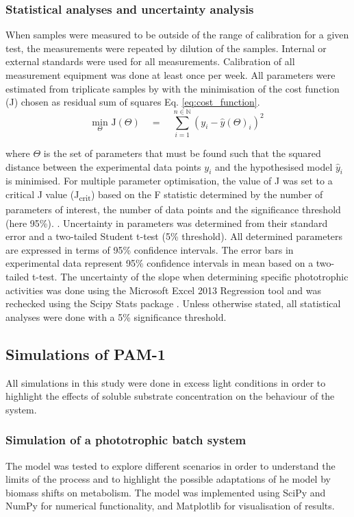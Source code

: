\subsubsection{Statistical analyses and uncertainty analysis}
When samples were measured to be outside of the range of calibration for a given test, the measurements were repeated by dilution of the samples. Internal or external standards were used for all measurements. Calibration of all measurement equipment was done at least once per week. All parameters were estimated from triplicate samples by with the minimisation of the cost function (J) chosen as residual sum of squares Eq. \eqref{eq:cost_function}.
\begin{equation}
    \label{eq:cost_function}
    \underset{\Theta}{\mathrm{min}}\, \, \mathrm{J}(\Theta)\quad  = \quad \sum_{i = 1}^{n\in\mathbb{N}} \left(y_i - \hat{y}(\Theta)_i    \right)^2
\end{equation}

where $\Theta$ is the set of parameters that must be found such that the squared distance between the experimental data points $y_i$ and the hypothesised model $\hat{y}_i$ is minimised. For multiple parameter optimisation, the value of J was set to a critical J value (J\textsubscript{crit}) based on the F statistic determined by the number of parameters of interest, the number of data points and the significance threshold (here 95\%). \cite{Batstone2003}. Uncertainty in parameters was determined from their standard error and a two-tailed Student t-test (5\% threshold). All determined parameters are expressed in terms of 95\% confidence intervals. The error bars in experimental data represent 95\% confidence intervals in mean based on a two-tailed t-test. The uncertainty of the slope when determining specific phototrophic activities was done using the Microsoft Excel 2013 Regression tool and was rechecked using the Scipy Stats package \cite{Scipy2001}. Unless otherwise stated, all statistical analyses were done with a 5\% significance threshold.

\subsection{Simulations of PAM-1}
All simulations in this study were done in excess light conditions in order to highlight the effects of soluble substrate concentration on the behaviour of the system.

\subsubsection{Simulation of a phototrophic batch system}
The model was tested to explore different scenarios in order to understand the limits of the process and to highlight the possible adaptations of he model by biomass shifts on metabolism. The model was implemented using SciPy \cite{SciPy2001} and NumPy \cite{NumPy2011} for numerical functionality, and Matplotlib \cite{Hunter2007a} for visualisation of results.





